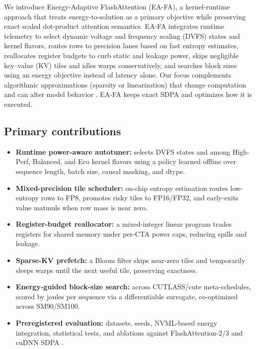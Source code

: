 \documentclass{article}
\begin{document}
We introduce Energy-Adaptive FlashAttention (EA-FA), a kernel-runtime approach that treats energy-to-solution as a primary objective while preserving exact scaled dot-product attention semantics. EA-FA integrates runtime telemetry to select dynamic voltage and frequency scaling (DVFS) states and kernel flavors, routes rows to precision lanes based on fast entropy estimates, reallocates register budgets to curb static and leakage power, skips negligible key–value (KV) tiles and idles warps conservatively, and searches block sizes using an energy objective instead of latency alone. Our focus complements algorithmic approximations (sparsity or linearization) that change computation and can alter model behavior \cite{pagliardini-2023-fast,rabe-2021-self,hassani-2024-faster,nguyen-2022-fourierformer,nahshan-2023-linear}. EA-FA keeps exact SDPA and optimizes how it is executed.

\subsection{Primary contributions}
\begin{itemize}
  \item \textbf{Runtime power-aware autotuner:} selects DVFS states and among High-Perf, Balanced, and Eco kernel flavors using a policy learned offline over sequence length, batch size, causal masking, and dtype.
  \item \textbf{Mixed-precision tile scheduler:} on-chip entropy estimation routes low-entropy rows to FP8, promotes risky tiles to FP16/FP32, and early-exits value matmuls when row mass is near zero.
  \item \textbf{Register-budget reallocator:} a mixed-integer linear program trades registers for shared memory under per-CTA power caps, reducing spills and leakage.
  \item \textbf{Sparse-KV prefetch:} a Bloom filter skips near-zero tiles and temporarily sleeps warps until the next useful tile, preserving exactness.
  \item \textbf{Energy-guided block-size search:} across CUTLASS/cute meta-schedules, scored by joules per sequence via a differentiable surrogate, co-optimized across SM90/SM100.
  \item \textbf{Preregistered evaluation:} datasets, seeds, NVML-based energy integration, statistical tests, and ablations against FlashAttention-2/3 and cuDNN SDPA \cite{dao-2022-flashattention,dao-2023-flashattention,shah-2024-flashattention}.
\end{itemize}
\end{document}
